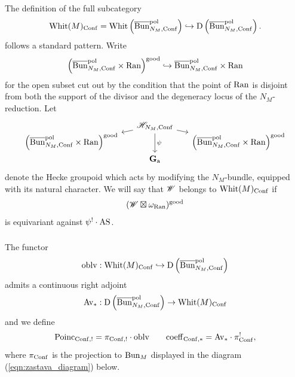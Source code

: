 \subsubsection{} The definition of the full subcategory
    \[
    \mathrm{Whit}(M)_{\mathrm{Conf}} = \mathrm{Whit}\left(\overline{\mathrm{Bun}}_{N_M, \mathrm{Conf}}^{\mathrm{pol}}\right) \hookrightarrow \mathrm{D}\left(\overline{\mathrm{Bun}}_{N_M, \mathrm{Conf}}^{\mathrm{pol}}\right).
    \]
follows a standard pattern. Write
    \[\left(\overline{\mathrm{Bun}}_{N_M, \mathrm{Conf}}^{\mathrm{pol}} \times \mathrm{Ran} \right)^{\mathrm{good}} \hookrightarrow \overline{\mathrm{Bun}}_{N_M, \mathrm{Conf}}^{\mathrm{pol}} \times \mathrm{Ran}\]
for the open subset cut out by the condition that the point of $\mathrm{Ran}$ is disjoint from both the support of the divisor and the degeneracy locus of the $N_M$-reduction. Let
\begin{equation}
\label{eqn:Whit_Conf_Hecke}
\begin{tikzcd}[
  column sep={10em,between origins},
  row sep={2em,between origins}
]
    & \HH_{N_M, \Conf} \arrow[dl] \arrow[dr] \arrow[dd, "\psi"] & \\
    \left(\Bunc_{N_M, \Conf}^\pol \times \Ran \right)^\good & & \left(\Bunc_{N_M, \Conf}^\pol \times \Ran \right)^\good \\
    & \Ga &
\end{tikzcd}
\end{equation}
denote the Hecke groupoid which acts by modifying the $N_M$-bundle, equipped with its natural character. We will say that $\mathscr{W}$ belongs to $\mathrm{Whit}(M)_{\mathrm{Conf}}$ if 
    \[(\mathscr{W} \boxtimes \omega_{\mathrm{Ran}})^{\mathrm{good}}\]
is equivariant against $\psi^! \cdot \mathrm{AS}$.

\subsubsection{} The functor
    \[
    \mathrm{oblv} : \mathrm{Whit}(M)_{\mathrm{Conf}} \hookrightarrow \mathrm{D}\left(\overline{\mathrm{Bun}}_{N_M, \mathrm{Conf}}^{\mathrm{pol}}\right)
    \]
admits a continuous right adjoint
    \[
    \mathrm{Av}_* : \mathrm{D}\left(\overline{\mathrm{Bun}}_{N_M, \mathrm{Conf}}^{\mathrm{pol}}\right) \to \mathrm{Whit}(M)_{\mathrm{Conf}} 
    \]
and we define
    \[
    \mathrm{Poinc}_{\mathrm{Conf},!} = \pi_{\mathrm{Conf},!} \cdot \mathrm{oblv}
    \qquad
    \mathrm{coeff}_{\mathrm{Conf},*} = \mathrm{Av}_* \cdot \pi_{\mathrm{Conf}}^!,
    \]
where $\pi_{\mathrm{Conf}}$ is the projection to $\mathrm{Bun}_M$ displayed in the diagram (\ref{eqn:zastava_diagram}) below.


